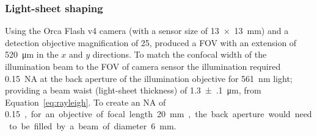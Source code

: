 \begin{figure}
    \label{fig:spim_cad}
\end{figure}
\clearpage
%


\subsubsection{Light-sheet shaping} %


Using the Orca Flash v4 camera (with a sensor size of \SI[product-units=repeat]{13x13}{\milli\meter}) and a detection objective magnification of \SI{25}{\times}, produced a \gls{FOV} with an extension of
\SI{520}{\micro\meter} in the \(x\) and \(y\) directions.
To match the confocal width of the illumination beam to the \gls{FOV} of camera sensor the illumination required \SI{0.15}{}~\gls{NA} at the back aperture of the illumination objective for \SI{561}{\nano\meter} light; providing a beam waist (\gls{light-sheet} thickness) of \SI{1.3(1)}{\micro\meter}, from Equation~\ref{eq:rayleigh}.
To create an \gls{NA} of \SI{0.15}, for an objective of focal length \SI{20}{\milli\meter}, the back aperture would need to be filled by a beam of diameter \SI{6}{\milli\meter}.

